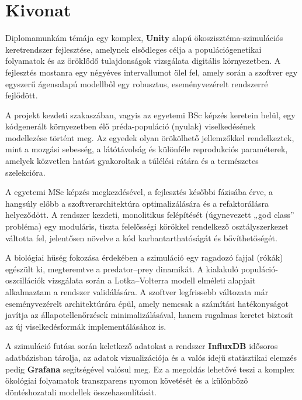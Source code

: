 \setcounter{page}{1}

\selecthungarian
\chapter*{Kivonat}

\noindent Diplomamunkám témája egy komplex, \textbf{Unity} alapú ökoszisztéma-szimulációs keretrendszer fejlesztése, amelynek elsődleges célja a populációgenetikai folyamatok és az öröklődő tulajdonságok vizsgálata digitális környezetben. A fejlesztés mostanra egy négyéves intervallumot ölel fel, amely során a szoftver egy egyszerű ágensalapú modellből egy robusztus, eseményvezérelt rendszerré fejlődött.

A projekt kezdeti szakaszában, vagyis az egyetemi BSc képzés keretein belül, egy kódgenerált környezetben élő préda-populáció (nyulak) viselkedésének modellezése történt meg. Az egyedek olyan örökölhető jellemzőkkel rendelkeztek, mint a mozgási sebesség, a látótávolság és különféle reprodukciós paraméterek, amelyek közvetlen hatást gyakoroltak a túlélési rátára és a természetes szelekcióra.

A egyetemi MSc képzés megkezdésével, a fejlesztés későbbi fázisába érve, a hangsúly előbb a szoftverarchitektúra optimalizálására és a refaktorálásra helyeződött. A rendszer kezdeti, monolitikus felépítését (úgynevezett „god class” probléma) egy moduláris, tiszta felelősségi körökkel rendelkező osztályszerkezet váltotta fel, jelentősen növelve a kód karbantarthatóságát és bővíthetőségét.

A biológiai hűség fokozása érdekében a szimuláció egy ragadozó fajjal (rókák) egészült ki, megteremtve a predator–prey dinamikát. A kialakuló populáció-oszcillációk vizsgálata során a Lotka–Volterra modell elméleti alapjait alkalmaztam a rendszer validálására. A szoftver legfrissebb változata már eseményvezérelt architektúrára épül, amely nemcsak a számítási hatékonyságot javítja az állapotellenőrzések minimalizálásával, hanem rugalmas keretet biztosít az új viselkedésformák implementálásához is.

A szimuláció futása során keletkező adatokat a rendszer \textbf{InfluxDB} idősoros adatbázisban tárolja, az adatok vizualizációja és a valós idejű statisztikai elemzés pedig \textbf{Grafana} segítségével valósul meg. Ez a megoldás lehetővé teszi a komplex ökológiai folyamatok transzparens nyomon követését és a különböző döntéshozatali modellek összehasonlítását.
\vfill

